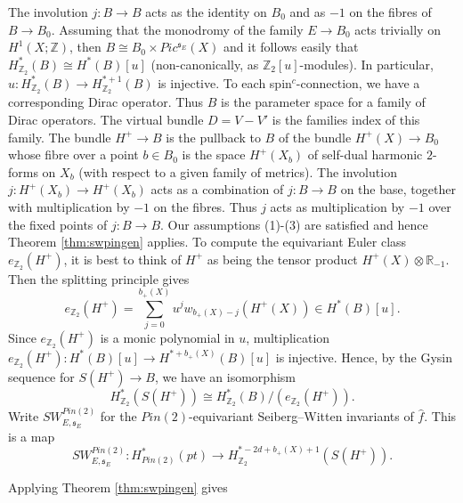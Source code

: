 \documentclass{amsart}
\theoremstyle{definition}
\theoremstyle{remark}
\numberwithin{equation}{section}
\begin{document}
The involution $j : B \to B$ acts as the identity on $B_0$ and as $-1$ on the fibres of $B \to B_0$. Assuming that the monodromy of the family $E \to B_0$ acts trivially on $H^1(X ; \mathbb{Z})$, then $B \cong B_0 \times Pic^{\mathfrak{s}_E}(X)$ and it follows easily that $H^*_{\mathbb{Z}_2}(B) \cong H^*(B)[u]$ (non-canonically, as $\mathbb{Z}_2[u]$-modules). In particular, $u : H^*_{\mathbb{Z}_2}(B) \to H^{*+1}_{\mathbb{Z}_2}(B)$ is injective. To each spin$^c$-connection, we have a corresponding Dirac operator. Thus $B$ is the parameter space for a family of Dirac operators. The virtual bundle $D = V - V'$ is the families index of this family. The bundle $H^+ \to B$ is the pullback to $B$ of the bundle $H^+(X) \to B_0$ whose fibre over a point $b \in B_0$ is the space $H^+(X_b)$ of self-dual harmonic $2$-forms on $X_b$ (with respect to a given family of metrics). The involution $j : H^+(X_b) \to H^+(X_b)$ acts as a combination of $j : B \to B$ on the base, together with multiplication by $-1$ on the fibres. Thus $j$ acts as multiplication by $-1$ over the fixed points of $j : B \to B$. Our assumptions (1)-(3) are satisfied and hence Theorem \ref{thm:swpingen} applies. To compute the equivariant Euler class $e_{\mathbb{Z}_2}(H^+)$, it is best to think of $H^+$ as being the tensor product $H^+(X) \otimes \mathbb{R}_{-1}$. Then the splitting principle gives
\begin{equation}\label{equ:eh+}
e_{\mathbb{Z}_2}(H^+) = \sum_{j=0}^{b_+(X)}u^j  w_{b_+(X)-j}( H^+(X) ) \in H^*(B)[u].
\end{equation}
Since $e_{\mathbb{Z}_2}(H^+)$ is a monic polynomial in $u$, multiplication $e_{\mathbb{Z}_2}(H^+) : H^*(B)[u] \to H^{*+b_+(X)}(B)[u]$ is injective. Hence, by the Gysin sequence for $S(H^+) \to B$, we have an isomorphism
\[
H^*_{\mathbb{Z}_2}( S(H^+) ) \cong H^*_{\mathbb{Z}_2}(B)/(e_{\mathbb{Z}_2}(H^+)).
\]
Write $SW^{Pin(2)}_{E,\mathfrak{s}_E}$ for the $Pin(2)$-equivariant Seiberg--Witten invariants of $\widehat{f}$. This is a map
\[
SW^{Pin(2)}_{E,\mathfrak{s}_E} : H^*_{Pin(2)}(pt) \to H^{*-2d+b_+(X)+1}_{\mathbb{Z}_2}( S(H^+) ).
\]

Applying Theorem \ref{thm:swpingen} gives
\end{document}
